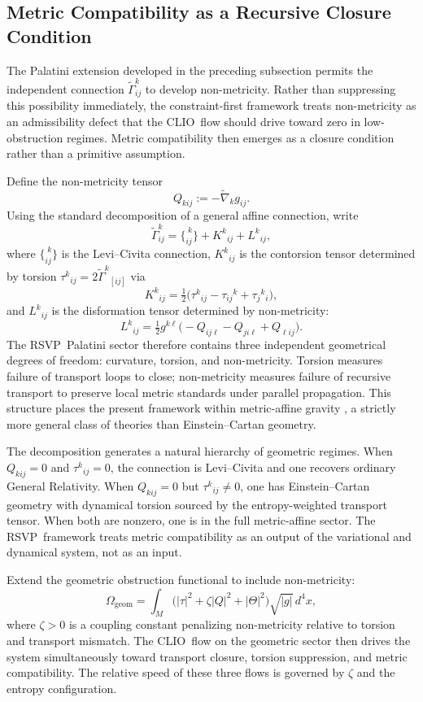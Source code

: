 \documentclass[12pt,a4paper]{article}
\newcommand{\RSVP}{\textrm{RSVP}}
\newcommand{\CLIO}{\textrm{CLIO}}
\begin{document}
\subsection{Metric Compatibility as a Recursive Closure Condition}

The Palatini extension developed in the preceding subsection permits the
independent connection $\widetilde{\Gamma}^k_{ij}$ to develop non-metricity.
Rather than suppressing this possibility immediately, the constraint-first
framework treats non-metricity as an admissibility defect that the \CLIO\ flow
should drive toward zero in low-obstruction regimes. Metric compatibility then
emerges as a closure condition rather than a primitive assumption.

Define the non-metricity tensor
\[
Q_{kij} := -\widetilde{\nabla}_k g_{ij}.
\]
Using the standard decomposition of a general affine connection, write
\[
\widetilde{\Gamma}^k_{ij}
= \{^{\;k}_{ij}\} + K^k{}_{ij} + L^k{}_{ij},
\]
where $\{^{\;k}_{ij}\}$ is the Levi--Civita connection, $K^k{}_{ij}$ is the
contorsion tensor determined by torsion $\tau^k{}_{ij}=2\widetilde{\Gamma}^k{}_{[ij]}$
via
\[
K^k{}_{ij}=\tfrac{1}{2}\bigl(\tau^k{}_{ij}-\tau_{ij}{}^k+\tau_{j}{}^k{}_i\bigr),
\]
and $L^k{}_{ij}$ is the disformation tensor determined by non-metricity:
\[
L^k{}_{ij}
= \tfrac{1}{2}g^{k\ell}
\bigl(-Q_{ij\ell} - Q_{ji\ell} + Q_{\ell ij}\bigr).
\]
The \RSVP\ Palatini sector therefore contains three independent geometrical
degrees of freedom: curvature, torsion, and non-metricity. Torsion measures
failure of transport loops to close; non-metricity measures failure of recursive
transport to preserve local metric standards under parallel propagation. This
structure places the present framework within metric-affine gravity
\cite{Hehl1995}, a strictly more general class of theories than
Einstein--Cartan geometry.

The decomposition generates a natural hierarchy of geometric regimes. When
$Q_{kij}=0$ and $\tau^k{}_{ij}=0$, the connection is Levi--Civita and one
recovers ordinary General Relativity. When $Q_{kij}=0$ but $\tau^k{}_{ij}\neq 0$,
one has Einstein--Cartan geometry with dynamical torsion sourced by the
entropy-weighted transport tensor. When both are nonzero, one is in the full
metric-affine sector. The \RSVP\ framework treats metric compatibility as an
output of the variational and dynamical system, not as an input.

Extend the geometric obstruction functional to include non-metricity:
\[
\Omega_\mathrm{geom}
= \int_M\!\bigl(|\tau|^2 + \zeta|Q|^2 + |\Theta|^2\bigr)\sqrt{|g|}\,d^4x,
\]
where $\zeta>0$ is a coupling constant penalizing non-metricity relative to
torsion and transport mismatch. The \CLIO\ flow on the geometric sector then
drives the system simultaneously toward transport closure, torsion suppression,
and metric compatibility. The relative speed of these three flows is governed
by $\zeta$ and the entropy configuration.
\end{document}
